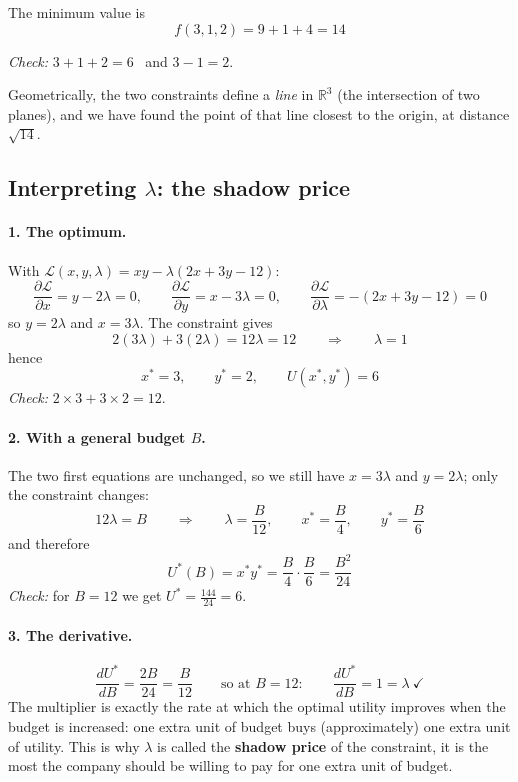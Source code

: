 \documentclass[]{article}
\newcommand{\R}{\mathbb{R}}
\begin{document}
	The minimum value is
	$$
	f(3,1,2) = 9 + 1 + 4 = 14
	$$

	\textit{Check:} $3 + 1 + 2 = 6$ \checkmark \ and $3 - 1 = 2$. \checkmark

	Geometrically, the two constraints define a \textit{line} in $\R^3$ (the intersection of two planes), and we have found the point of that line closest to the origin, at distance $\sqrt{14}$.

	\subsection{Interpreting $\lambda$: the shadow price}

	\paragraph{1. The optimum.}
	With $\mathcal{L}(x,y,\lambda) = xy - \lambda(2x + 3y - 12)$:
	$$
	\frac{\partial \mathcal{L}}{\partial x} = y - 2\lambda = 0,
	\qquad
	\frac{\partial \mathcal{L}}{\partial y} = x - 3\lambda = 0,
	\qquad
	\frac{\partial \mathcal{L}}{\partial \lambda} = -(2x + 3y - 12) = 0
	$$
	so $y = 2\lambda$ and $x = 3\lambda$.
	The constraint gives
	$$
	2(3\lambda) + 3(2\lambda) = 12\lambda = 12
	\qquad \Longrightarrow \qquad
	\lambda = 1
	$$
	hence
	$$
	x^* = 3, \qquad y^* = 2, \qquad U(x^*,y^*) = 6
	$$
	\textit{Check:} $2 \times 3 + 3 \times 2 = 12$. \checkmark

	\paragraph{2. With a general budget $B$.}
	The two first equations are unchanged, so we still have $x = 3\lambda$ and $y = 2\lambda$; only the constraint changes:
	$$
	12\lambda = B
	\qquad \Longrightarrow \qquad
	\lambda = \frac{B}{12},
	\qquad
	x^* = \frac{B}{4},
	\qquad
	y^* = \frac{B}{6}
	$$
	and therefore
	$$
	U^*(B) = x^* y^* = \frac{B}{4} \cdot \frac{B}{6} = \frac{B^2}{24}
	$$
	\textit{Check:} for $B = 12$ we get $U^* = \frac{144}{24} = 6$. \checkmark

	\paragraph{3. The derivative.}
	$$
	\frac{dU^*}{dB} = \frac{2B}{24} = \frac{B}{12}
	\qquad \text{so at } B = 12: \qquad
	\frac{dU^*}{dB} = 1 = \lambda \ \checkmark
	$$
	The multiplier is exactly the rate at which the optimal utility improves when the budget is increased: one extra unit of budget buys (approximately) one extra unit of utility.
	This is why $\lambda$ is called the \textbf{shadow price} of the constraint, it is the most the company should be willing to pay for one extra unit of budget.
\end{document}
